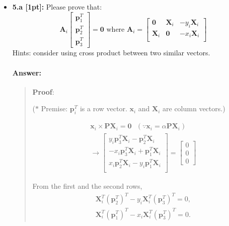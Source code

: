 \documentclass[11pt]{article}
\begin{document}
\begin{itemize}
\item \textbf{5.a [1pt]:} Please prove that:
\[
\mathbf{A}_i 
\left[
\begin{array}{c}
\mathbf{p}_1^T \\
\mathbf{p}_2^T \\
\mathbf{p}_3^T
\end{array}
\right] = \mathbf{0} \textrm{\ where \ } \mathbf{A}_i = \left[
\begin{array}{ccc}
\mathbf{0} & \mathbf{X}_i & - y_i \mathbf{X}_i \\
\mathbf{X}_i & \mathbf{0} & - x_i \mathbf{X}_i\\
\end{array}
\right]
\]
Hints: consider using cross product between two similar vectors. 

\paragraph{Answer:} 
\begin{quote}
    \textbf{Proof}:
    
    ($\ast$ Premise: $\mathbf{p}_i^T$ is a row vector. $\mathbf{x}_i$ and $\mathbf{X}_i$ are column vectors.)

    \begin{equation*}
    \begin{split}
        \mathbf{x}_i \times \mathbf{P} \mathbf{X}_i = \mathbf{0} ~~~ (\because \mathbf{x}_i = \alpha \mathbf{P} \mathbf{X}_i) \\
        \to 
        \begin{bmatrix}
            y_i \mathbf{p}_3^T \mathbf{X}_i - \mathbf{p}_2^T \mathbf{X}_i \\
            -x_i \mathbf{p}_3^T \mathbf{X}_i + \mathbf{p}_1^T \mathbf{X}_i \\
            x_i \mathbf{p}_2^T \mathbf{X}_i - y_i \mathbf{p}_1^T \mathbf{X}_i \\
        \end{bmatrix} =
        \begin{bmatrix}
            0 \\ 0 \\ 0
        \end{bmatrix}
    \end{split}
    \end{equation*}
    
    From the first and the second rows, 
    \begin{equation*}
    \begin{split}
        \mathbf{X}_i^T (\mathbf{p}_2^T)^T - y_i \mathbf{X}_i^T (\mathbf{p}_3^T)^T = 0, \\
        \mathbf{X}_i^T (\mathbf{p}_1^T)^T - x_i \mathbf{X}_i^T (\mathbf{p}_3^T)^T = 0.
    \end{split}
    \end{equation*}
    

\end{quote}
\end{itemize}
\end{document}
